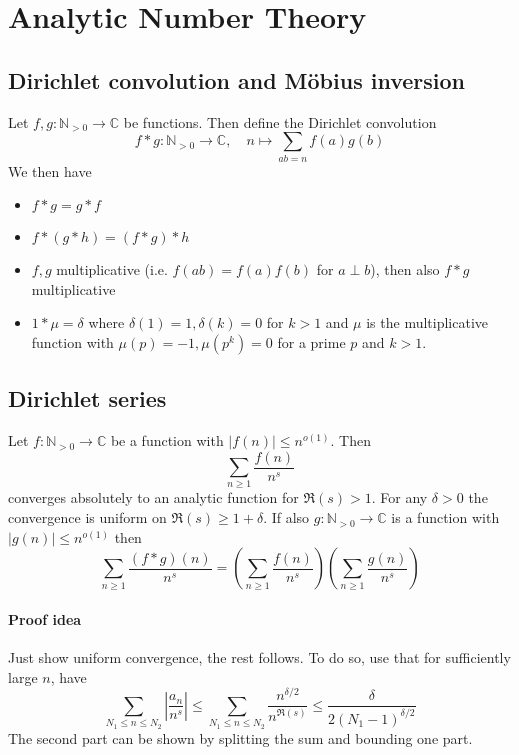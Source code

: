 \documentclass{scrartcl}
\newcommand{\N}{\mathbb{N}}
\newcommand{\C}{\mathbb{C}}
\begin{document}
\section{Analytic Number Theory}

\subsection{Dirichlet convolution and Möbius inversion}
Let $f, g: \N_{>0} \to \C$ be functions. Then define the Dirichlet convolution
\begin{equation*}
    f * g: \N_{>0} \to \C, \quad n \mapsto \sum_{ab = n} f(a) g(b)
\end{equation*}
We then have
\begin{itemize}
    \item $f * g = g * f$
    \item $f * (g * h) = (f * g) * h$
    \item $f, g$ multiplicative (i.e. $f(ab) = f(a)f(b)$ for $a \perp b$), then also $f * g$ multiplicative
    \item $1 * \mu = \delta$ where $\delta(1) = 1, \delta(k) = 0$ for $k > 1$ and $\mu$ is the multiplicative function with $\mu(p) = -1, \mu(p^k) = 0$ for a prime $p$ and $k > 1$.
\end{itemize}

\subsection{Dirichlet series}
Let $f: \N_{> 0} \to \C$ be a function with $|f(n)| \leq n^{o(1)}$. Then
\begin{equation*}
    \sum_{n \geq 1} \frac {f(n)} {n^s}
\end{equation*}
converges absolutely to an analytic function for $\Re(s) > 1$.
For any $\delta > 0$ the convergence is uniform on $\Re(s) \geq 1 + \delta$.
If also $g: \N_{> 0} \to \C$ is a function with $|g(n)| \leq n^{o(1)}$ then
\begin{equation*}
    \sum_{n \geq 1} \frac {(f * g)(n)} {n^s} = \left( \sum_{n \geq 1} \frac {f(n)} {n^s} \right)\left( \sum_{n \geq 1} \frac {g(n)} {n^s} \right)
\end{equation*}
\paragraph{Proof idea} Just show uniform convergence, the rest follows. To do so, use that for sufficiently large $n$, have
\begin{equation*}
    \sum_{N_1 \leq n \leq N_2} \left| \frac {a_n} {n^s} \right| \leq \sum_{N_1 \leq n \leq N_2} \frac {n^{\delta/2}} {n^{\Re(s)}} \leq \frac {\delta} {2(N_1 - 1)^{\delta/2}}
\end{equation*}
The second part can be shown by splitting the sum and bounding one part.
\end{document}
